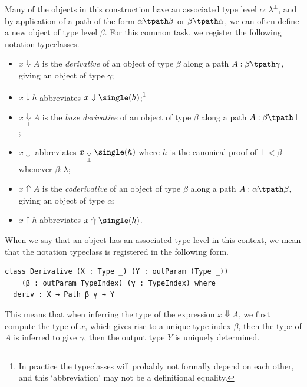 Many of the objects in this construction have an associated type level \( \alpha : \lambda^\bot \), and by application of a path of the form \( \alpha \tpath \beta \) or \( \beta \tpath \alpha \), we can often define a new object of type level \( \beta \).
For this common task, we register the following notation typeclasses.
\begin{itemize}
  \item \( x \Downarrow A \) is the \emph{derivative} of an object of type \( \beta \) along a path \( A : \beta \tpath \gamma \), giving an object of type \( \gamma \);
  \item \( x \downarrow h \) abbreviates \( x \Downarrow \single(h) \);\footnote{In practice the typeclasses will probably not formally depend on each other, and this `abbreviation' may not be a definitional equality.}
  \item \( x \underset{\bot}{\Downarrow} A \) is the \emph{base derivative} of an object of type \( \beta \) along a path \( A : \beta \tpath \bot \);
  \item \( x \underset{\bot}{\downarrow} \) abbreviates \( x \underset{\bot}{\Downarrow} \single(h) \) where \( h \) is the canonical proof of \( \bot < \beta \) whenever \( \beta : \lambda \);
  \item \( x \Uparrow A \) is the \emph{coderivative} of an object of type \( \beta \) along a path \( A : \alpha \tpath \beta \), giving an object of type \( \alpha \);
  \item \( x \uparrow h \) abbreviates \( x \Uparrow \single(h) \).
\end{itemize}

When we say that an object has an associated type level in this context, we mean that the notation typeclass is registered in the following form.

\begin{verbatim}
class Derivative (X : Type _) (Y : outParam (Type _))
    (β : outParam TypeIndex) (γ : TypeIndex) where
  deriv : X → Path β γ → Y
\end{verbatim}

This means that when inferring the type of the expression \( x \Downarrow A \), we first compute the type of \( x \), which gives rise to a unique type index \( \beta \), then the type of \( A \) is inferred to give \( \gamma \), then the output type \( Y \) is uniquely determined.

